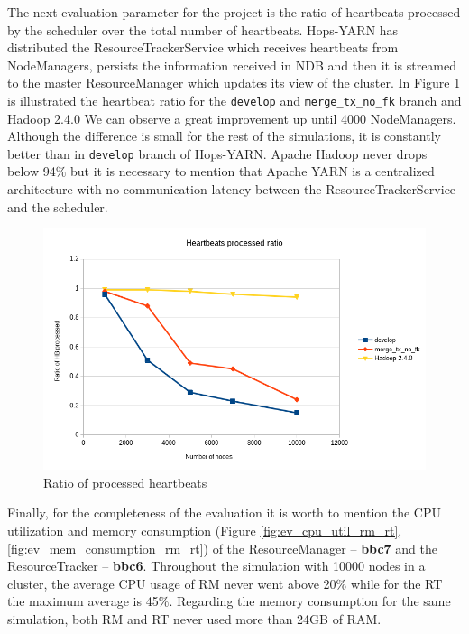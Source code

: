 The next evaluation parameter for the project is the ratio of
heartbeats processed by the scheduler over the total number of
heartbeats. Hops-YARN has distributed the ResourceTrackerService which
receives heartbeats from NodeManagers, persists the information
received in NDB and then it is streamed to the master ResourceManager
which updates its view of the cluster. In Figure
\ref{fig:ev_hb_processed_final} is illustrated the heartbeat ratio for
the \texttt{develop} and \texttt{merge\_tx\_no\_fk} branch and Hadoop
2.4.0 We can observe a great improvement up until 4000
NodeManagers. Although the difference is small for the rest of the
simulations, it is constantly better than in \texttt{develop} branch
of Hops-YARN. Apache Hadoop never drops below 94$\%$ but it is
necessary to
mention that Apache YARN is a centralized architecture with no
communication latency between the ResourceTrackerService and the scheduler.

\begin{figure}
\centering
\includegraphics[scale=0.7]{resources/images/Evaluation/hb_processed_final.png}
\caption{Ratio of processed heartbeats}
\label{fig:ev_hb_processed_final}
\end{figure}

Finally, for the completeness of the evaluation it is worth to mention the
CPU utilization and memory
consumption (Figure  \ref{fig:ev_cpu_util_rm_rt}, \ref{fig:ev_mem_consumption_rm_rt}) of the
ResourceManager -- \textbf{bbc7} and the
ResourceTracker -- \textbf{bbc6}. Throughout the simulation with 10000 nodes in a
cluster, the average CPU usage of RM never went above 20$\%$ while for
the RT the maximum average is 45$\%$. Regarding the memory consumption
for the same simulation, both RM and RT never used more than 24GB of RAM.

